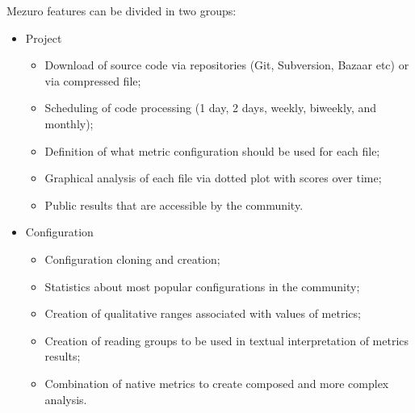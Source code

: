 \documentclass{llncs}
\begin{document}
Mezuro features can be divided in two groups:

\begin{itemize}
    \item Project

    \begin{itemize}
        \item Download of source code via repositories (Git, Subversion, Bazaar etc) or via compressed file;
        \item Scheduling of code processing (1 day, 2 days, weekly, biweekly, and monthly);
        \item Definition of what metric configuration should be used for each file;
        \item Graphical analysis of each file via dotted plot with scores over time;
        \item Public results that are accessible by the community.
    \end{itemize}
    \item Configuration
    \begin{itemize}
        \item Configuration cloning and creation;
        \item Statistics about most popular configurations in the community;
        \item Creation of qualitative ranges associated with values of metrics;
        \item Creation of reading groups to be used in textual interpretation of metrics results;
        \item Combination of native metrics to create composed and more complex analysis.
    \end{itemize}
\end{itemize}
\end{document}
